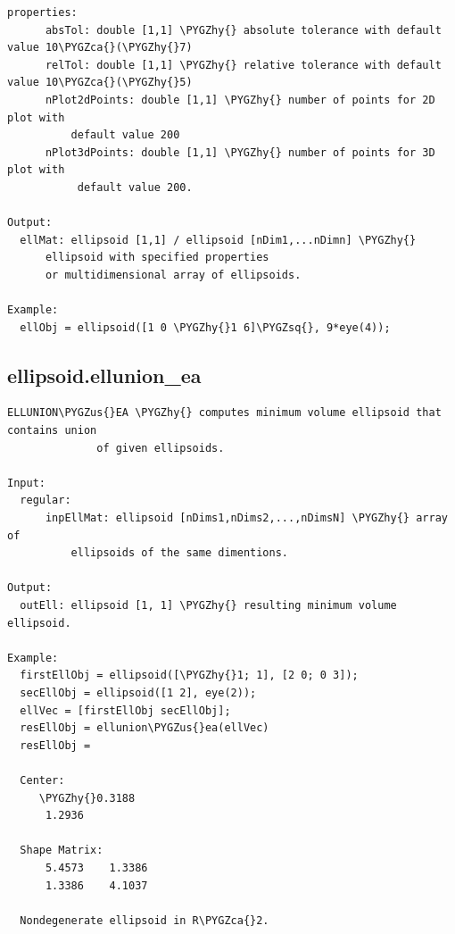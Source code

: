 \documentclass[letterpaper,10pt,english]{sphinxmanual}
\def\PYGZus{\char`\_}
\def\PYGZca{\char`\^}
\def\PYGZhy{\char`\-}
\def\PYGZsq{\char`\'}
\begin{document}
\begin{Verbatim}[commandchars=\\\{\}]
  properties:
      absTol: double [1,1] \PYGZhy{} absolute tolerance with default value 10\PYGZca{}(\PYGZhy{}7)
      relTol: double [1,1] \PYGZhy{} relative tolerance with default value 10\PYGZca{}(\PYGZhy{}5)
      nPlot2dPoints: double [1,1] \PYGZhy{} number of points for 2D plot with
          default value 200
      nPlot3dPoints: double [1,1] \PYGZhy{} number of points for 3D plot with
           default value 200.

Output:
  ellMat: ellipsoid [1,1] / ellipsoid [nDim1,...nDimn] \PYGZhy{}
      ellipsoid with specified properties
      or multidimensional array of ellipsoids.

Example:
  ellObj = ellipsoid([1 0 \PYGZhy{}1 6]\PYGZsq{}, 9*eye(4));
\end{Verbatim}


\subsection{ellipsoid.ellunion\_ea}
\label{chap_functions:ellipsoid-ellunion-ea}
\begin{Verbatim}[commandchars=\\\{\}]
ELLUNION\PYGZus{}EA \PYGZhy{} computes minimum volume ellipsoid that contains union
              of given ellipsoids.

Input:
  regular:
      inpEllMat: ellipsoid [nDims1,nDims2,...,nDimsN] \PYGZhy{} array of
          ellipsoids of the same dimentions.

Output:
  outEll: ellipsoid [1, 1] \PYGZhy{} resulting minimum volume ellipsoid.

Example:
  firstEllObj = ellipsoid([\PYGZhy{}1; 1], [2 0; 0 3]);
  secEllObj = ellipsoid([1 2], eye(2));
  ellVec = [firstEllObj secEllObj];
  resEllObj = ellunion\PYGZus{}ea(ellVec)
  resEllObj =

  Center:
     \PYGZhy{}0.3188
      1.2936

  Shape Matrix:
      5.4573    1.3386
      1.3386    4.1037

  Nondegenerate ellipsoid in R\PYGZca{}2.
\end{Verbatim}
\end{document}
